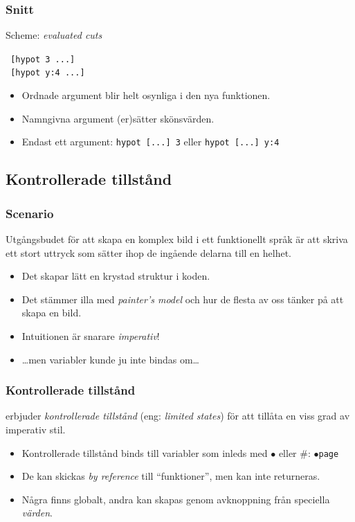\documentclass[noamsthm,handout]{beamer}
\newcommand{\inEnglish}[1]{(eng: \emph{#1})}
\begin{document}
\begin{frame}\frametitle{Snitt}
  Scheme: \emph{evaluated cuts}

  \texttt{%
    [hypot 3 ...]
  }
  \\
  \texttt{%
    [hypot y:4 ...]
  }

  \begin{itemize}
  \item Ordnade argument blir helt osynliga i den nya funktionen.
  \item Namngivna argument (er)sätter skönsvärden.
  \item Endast ett argument: \texttt{hypot [...] 3} eller \texttt{hypot [...] y:4}
  \end{itemize}
  
\end{frame}
\subsection{Kontrollerade tillstånd}
\begin{frame}\frametitle{Scenario}
  Utgångsbudet för att skapa en komplex bild i ett funktionellt språk är att skriva ett stort uttryck som sätter ihop de ingående delarna till en helhet.

  \begin{itemize}
  \item Det skapar lätt en krystad struktur i koden.
  \item Det stämmer illa med \emph{painter's model} och hur de flesta av oss tänker på att skapa en bild.
  \item Intuitionen är snarare \emph{imperativ}!
  \item \ldots men variabler kunde ju inte bindas om\ldots
  \end{itemize}

\end{frame}
\begin{frame}\frametitle{Kontrollerade tillstånd}
  \Shapes erbjuder \emph{kontrollerade tillstånd} \inEnglish{limited states} för att tillåta en viss grad av imperativ stil.

  \begin{itemize}
  \item Kontrollerade tillstånd binds till variabler som inleds med $\bullet$ eller $\#$: \texttt{$\bullet$page}
  \item De kan skickas \emph{by reference} till ``funktioner'', men kan inte returneras.
  \item Några finns globalt, andra kan skapas genom avknoppning från speciella \emph{värden}.
  \end{itemize}

\end{frame}
\end{document}

